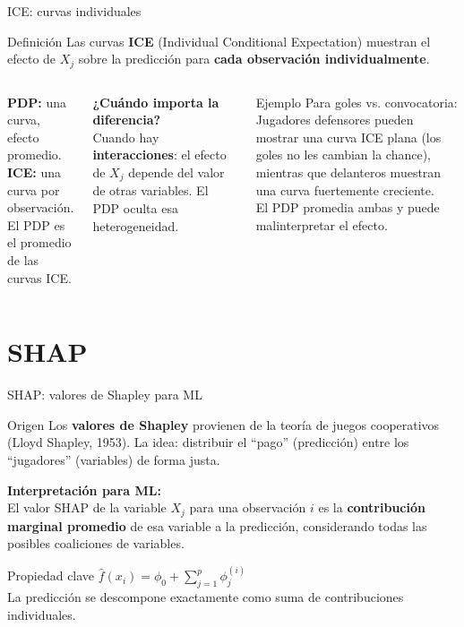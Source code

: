 \documentclass[aspectratio=169]{beamer}
\begin{document}
\begin{frame}{ICE: curvas individuales}
  \begin{block}{Definición}
    Las curvas \textbf{ICE} (Individual Conditional Expectation) muestran el efecto de $X_j$ sobre la predicción para \textbf{cada observación individualmente}.
  \end{block}

  \bigskip
  \begin{columns}
      \textbf{PDP:} una curva, efecto promedio.\\
      \textbf{ICE:} una curva por observación.\\
      El PDP es el promedio de las curvas ICE.

      \bigskip
      \textbf{¿Cuándo importa la diferencia?}\\
      Cuando hay \textbf{interacciones}: el efecto de $X_j$ depende del valor de otras variables. El PDP oculta esa heterogeneidad.
      \begin{exampleblock}{Ejemplo}
        Para goles vs. convocatoria:\\
        Jugadores defensores pueden mostrar una curva ICE plana (los goles no les cambian la chance), mientras que delanteros muestran una curva fuertemente creciente.\\
        El PDP promedia ambas y puede malinterpretar el efecto.
      \end{exampleblock}
  \end{columns}
\end{frame}

\section{SHAP}

\begin{frame}{SHAP: valores de Shapley para ML}
  \begin{block}{Origen}
    Los \textbf{valores de Shapley} provienen de la teoría de juegos cooperativos (Lloyd Shapley, 1953). La idea: distribuir el ``pago'' (predicción) entre los ``jugadores'' (variables) de forma justa.
  \end{block}

  \bigskip
  \textbf{Interpretación para ML:}\\
  El valor SHAP de la variable $X_j$ para una observación $i$ es la \textbf{contribución marginal promedio} de esa variable a la predicción, considerando todas las posibles coaliciones de variables.

  \bigskip
  \begin{alertblock}{Propiedad clave}
    $\hat{f}(x_i) = \phi_0 + \sum_{j=1}^{p} \phi_j^{(i)}$\\
    La predicción se descompone exactamente como suma de contribuciones individuales.
  \end{alertblock}
\end{frame}
\end{document}
